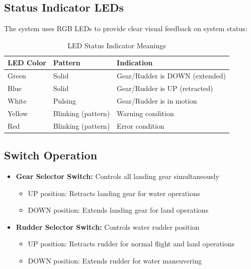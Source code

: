 \documentclass[12pt,a4paper,twoside,openright]{book}
\newcommand{\tabletextfont}{\normalfont\rmfamily}
\newcommand{\tableheadfont}{\normalfont\bfseries}
\begin{document}
\subsection{Status Indicator LEDs}
The system uses RGB LEDs to provide clear visual feedback on system status:

\begin{table}[h]
\centering
\setlength{\tabcolsep}{5pt} %
\begin{tabular}{|p{}|p{}|p{}|}
\hline
\tableheadfont\textbf{LED Color} & \tableheadfont\textbf{Pattern} & \tableheadfont\textbf{Indication} \\
\hline
\tabletextfont Green & Solid & Gear/Rudder is DOWN (extended) \\
\hline
\tabletextfont Blue & Solid & Gear/Rudder is UP (retracted) \\
\hline
\tabletextfont White & Pulsing & Gear/Rudder is in motion \\
\hline
\tabletextfont Yellow & Blinking (pattern) & Warning condition \\
\hline
\tabletextfont Red & Blinking (pattern) & Error condition \\
\hline
\end{tabular}
\caption{LED Status Indicator Meanings}
\end{table}

\subsection{Switch Operation}
\begin{itemize}
    \item \textbf{Gear Selector Switch:} Controls all landing gear simultaneously
    \begin{itemize}
        \item UP position: Retracts landing gear for water operations
        \item DOWN position: Extends landing gear for land operations
    \end{itemize}
    \item \textbf{Rudder Selector Switch:} Controls water rudder position
    \begin{itemize}
        \item UP position: Retracts rudder for normal flight and land operations
        \item DOWN position: Extends rudder for water maneuvering
    \end{itemize}
\end{itemize}
\end{document}
